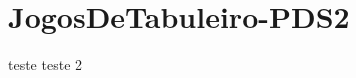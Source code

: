 \chapter{Jogos\+De\+Tabuleiro-\/\+PDS2}
\hypertarget{md_README}{}\label{md_README}
\label{md_README_autotoc_md0}%
%


teste teste 2 